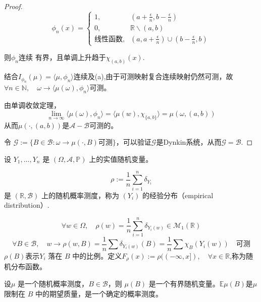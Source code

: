 \begin{proof}
\[\phi_{n}(x) =
\begin{cases}
1, & (a + \frac{\epsilon}{n}, b - \frac{\epsilon}{n}) \\
0, & \mathbb{R}\backslash (a, b)\\
\text{线性函数},&(a,a+\frac{\epsilon}n)\cup(b-\frac{\epsilon}n,b)
\end{cases}\]



则$\phi_n$连续 有界，且单调上升趋于$\chi_{(a,b)}(x)$.

结合$I_{\phi_n}(\mu) = \langle\mu, \phi_n \rangle$连续及(a),由于可测映射复合连续映射仍然可测，故
$\forall n \in \mathbb{N}, \quad \omega \to \langle\mu(\omega),  \phi_n \rangle$可测。

由单调收敛定理，
\[\lim_{n \to \infty} \langle\mu(\omega), \phi_n \rangle = \langle\mu(w), \chi_{\{a,b\}}\rangle = \mu(\omega, (a,b))\]
从而$\mu(\cdot,(a,b))$是$\mathcal{A}-\mathcal{B}$可测的。

令 $ \mathcal{G} := \{B \in \mathcal{B} : \omega\rightarrow\mu(\cdot, B) \text{可测}\} $，可以验证$\mathcal{G}$是Dynkin系统，从而$\mathcal{G}=\mathcal{B}$.

    
\end{proof}


\begin{example}
    设 \( Y_1, \ldots, Y_n \) 是 \( (\Omega, \mathcal{A}, \mathbb{P}) \) 上的实值随机变量。

\begin{equation*}
\rho := \frac{1}{n} \sum_{i=1}^n \delta_{Y_i}
\end{equation*}
是 \( (\mathbb{R}, \mathcal{B}) \) 上的随机概率测度，称为 \( (Y_i) \) 的经验分布（empirical distribution）.

\begin{equation*}
\forall w \in \Omega, \quad \rho(w) = \frac{1}{n} \sum_{i=1}^n \delta_{Y_i(w)} \in \mathcal{M}_1(\mathbb{R})
\end{equation*}
\begin{equation*}
\forall B \in \mathcal{B}, \quad w \to \rho(w, B) = \frac{1}{n} \sum \delta_{Y_i(w)} (B)
= \frac{1}{n} \sum \chi_B(Y_i(w))\quad \text{可测}
\end{equation*}
$\rho(B)$表示\( Y_i \) 落在 \( B \) 中的比例。定义$F_\rho(x) := \rho((-\infty, x]), \quad \forall x \in \mathbb{R}$,称为随机分布函数。
\end{example}

设\(\mu\) 是一个随机概率测度，\( B \in \mathcal{B} \)，则 \(\mu(B)\) 是一个有界随机变量。\(\mathbb{E}\mu(B)\)是\(\mu\) 限制在 \( B \) 中的期望质量，是一个确定的概率测度。

